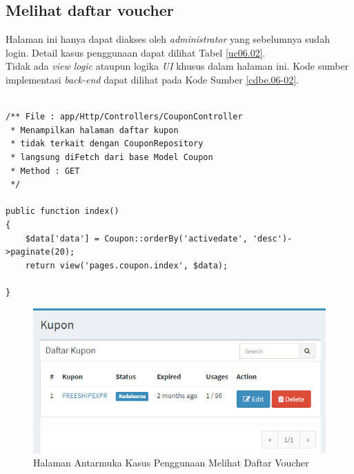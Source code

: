 \subsection{Melihat daftar voucher}
Halaman ini hanya dapat diakses oleh \textit{administrator} yang sebelumnya sudah login. Detail kasus penggunaan dapat dilihat Tabel \ref{uc06.02}.\\
\indent Tidak ada \textit{view logic} ataupun logika \textit{UI} khusus dalam halaman ini. Kode sumber implementasi \textit{back-end} dapat dilihat pada Kode Sumber \ref{cdbe.06-02}.

\begin{lstlisting}[label=cdbe.06-02,style=php,caption=Kode Sumber Antarmuka Registrasi]

/** File : app/Http/Controllers/CouponController
 * Menampilkan halaman daftar kupon
 * tidak terkait dengan CouponRepository
 * langsung diFetch dari base Model Coupon
 * Method : GET
 */

public function index()
{
    $data['data'] = Coupon::orderBy('activedate', 'desc')->paginate(20);
    return view('pages.coupon.index', $data);

}
\end{lstlisting}
      
  \begin{figure}[H]
    \centering
    \includegraphics[width=\textwidth]{images/bab4/ui/06-02.png}
    \caption{Halaman Antarmuka Kasus Penggunaan Melihat Daftar Voucher}
    \label{ui.06-02}
  \end{figure}
      
